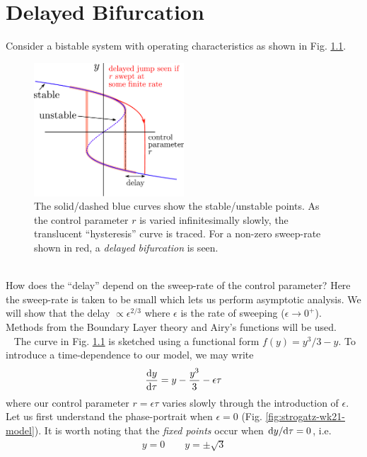 \chapter[Delayed Bifurcation]{Delayed Bifurcation}

Consider a bistable system with operating characteristics as shown in Fig. \ref{fig:strogatz-wk21}. 
\begin{figure}[!h]
	\centering
	\includegraphics[width=0.5\textwidth]{./plots/pdf/delayed-bifurcation.pdf}
	\caption{The solid/dashed blue curves show the stable/unstable points. As the control parameter $r$ is varied infinitesimally slowly, the translucent ``hysteresis'' curve is traced. For a non-zero sweep-rate shown in red, a \emph{delayed bifurcation} is seen.}
	\label{fig:strogatz-wk21}
\end{figure}\\
How does the ``delay'' depend on the sweep-rate of the control parameter? Here the sweep-rate is taken to be small which lets us perform asymptotic analysis. We will show that the delay $\propto \epsilon^{2/3}$ where $\epsilon$ is the rate of sweeping ($\epsilon \rightarrow 0^+$). Methods from the Boundary Layer theory and Airy's functions will be used. \\
\ \newline
The curve in Fig. \ref{fig:strogatz-wk21} is sketched using a functional form $f(y) = y^3/3-y$. To introduce a time-dependence to our model, we may write
\begin{gather*}
	\frac{\mathrm{d} y}{\mathrm{d} \tau} = y - \frac{y^3}{3} - \epsilon \tau
\end{gather*}
where our control parameter $r=\epsilon \tau$ varies slowly through the introduction of $\epsilon$. Let us first understand the phase-portrait when $\epsilon=0$ (Fig. \ref{fig:strogatz-wk21-model}). It is worth noting that the \emph{fixed points} occur when $\mathrm{d} y/\mathrm{d} \tau=0$, i.e. 
\begin{gather*}
	y=0 \qquad y = \pm \sqrt{3}
\end{gather*}
